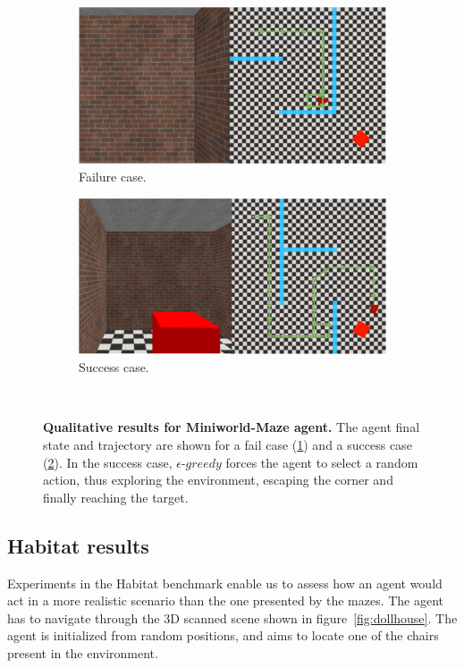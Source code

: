 \begin{figure}
    \centering
    \begin{subfigure}[b]{0.49\textwidth}
        \centering
        \includegraphics[width=\textwidth]{figures/understanding_vsn/qualitative_results/fail}
        \caption{Failure case.}
        \label{fig:maze_qualitative_fail}
    \end{subfigure}
    \hfill
    \begin{subfigure}[b]{0.49\textwidth}
        \centering
        \includegraphics[width=\textwidth]{figures/understanding_vsn/qualitative_results/success}
        \caption{Success case.}
        \label{fig:maze_qualitative_success}
    \end{subfigure}~\caption{\textbf{Qualitative results for Miniworld-Maze agent.} The agent final state and trajectory are shown for a fail case (\ref{fig:maze_qualitative_fail}) and a success case (\ref{fig:maze_qualitative_success}). In the success case, $\epsilon\text{-}greedy$ forces the agent to select a random action, thus exploring the environment, escaping the corner and finally reaching the target.}
    \label{fig:maze_qualitative}
\end{figure}

\subsection{Habitat results}\label{subsec:habitat-results}
Experiments in the Habitat benchmark enable us to assess how an agent would act in a more realistic scenario than the one presented by the mazes.
The agent has to navigate through the 3D scanned scene shown in figure~\ref{fig:dollhouse}.
The agent is initialized from random positions, and aims to locate one of the chairs present in the environment.

